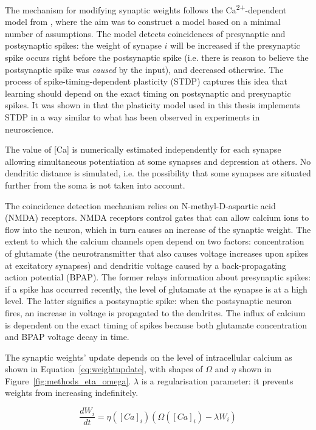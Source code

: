 \documentclass[a4paper,12pt]{report}
\theoremstyle{definition}
\begin{document}
The mechanism for modifying synaptic weights follows the Ca\textsuperscript{2+}-dependent model from \cite{shouval2002unified}, where the aim was to construct a model based on a minimal number of assumptions. The model detects coincidences of presynaptic and postsynaptic spikes: the weight of synapse $i$ will be increased if the presynaptic spike occurs right before the postsynaptic spike (i.e. there is reason to believe the postsynaptic spike was \emph{caused} by the input), and decreased otherwise. The process of spike-timing-dependent plasticity (STDP) captures this idea that learning should depend on the exact timing on postsynaptic and presynaptic spikes. It was shown in \cite{shouval2002unified} that the plasticity model used in this thesis implements STDP in a way similar to what has been observed in experiments in neuroscience.

The value of [Ca] is numerically estimated independently for each synapse allowing simultaneous potentiation at some synapses and depression at others. No dendritic distance is simulated, i.e. the possibility that some synapses are situated further from the soma is not taken into account.

The coincidence detection mechanism relies on N-methyl-D-aspartic acid (NMDA) receptors. NMDA receptors control gates that can allow calcium ions to flow into the neuron, which in turn causes an increase of the synaptic weight. The extent to which the calcium channels open depend on two factors: concentration of glutamate (the neurotransmitter that also causes voltage increases upon spikes at excitatory synapses) and dendritic voltage caused by a back-propagating action potential (BPAP). The former relays information about presynaptic spikes: if a spike has occurred recently, the level of glutamate at the synapse is at a high level. The latter signifies a postsynaptic spike: when the postsynaptic neuron fires, an increase in voltage is propagated to the dendrites. The influx of calcium is dependent on the exact timing of spikes because both glutamate concentration and BPAP voltage decay in time.

The synaptic weights' update depends on the level of intracellular calcium as shown in Equation~\ref{eq:weightupdate}, with shapes of $\Omega$ and $\eta$ shown in Figure~\ref{fig:methods_eta_omega}. $\lambda$ is a regularisation parameter: it prevents weights from increasing indefinitely.

\begin{equation}
\frac{dW_i}{dt} = \eta ([Ca]_i) (\Omega([Ca]_i) - \lambda W_i)
\label{eq:weightupdate}
\end{equation}
\end{document}
